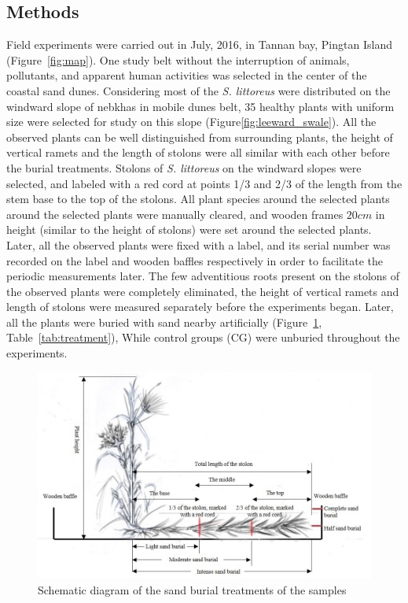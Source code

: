 \documentclass[]{interact}
\theoremstyle{plain}%
\theoremstyle{definition}
\theoremstyle{remark}
\begin{document}
\subsection{Methods}
Field experiments were carried out in July, 2016, in Tannan bay, Pingtan Island (Figure~\ref{fig:map}). One study belt without the interruption of animals, pollutants, and apparent human activities was selected in the center of the coastal sand dunes. 
Considering most of the \textit{S. littoreus} were distributed on the windward slope of nebkhas in mobile dunes belt, 35 healthy plants with uniform size were selected for study on this slope (Figure\ref{fig:leeward_swale}). All the observed plants can be well distinguished from surrounding plants, the height of vertical ramets and the length of stolons were all similar with each other before the burial treatments. Stolons of \textit{S. littoreus} on the windward slopes were selected, and labeled with a red cord at points 1/3 and 2/3 of the length from the stem base to the top of the stolons. All plant species around the selected plants around the selected plants were manually cleared, and wooden frames $20 cm$ in height (similar to the height of stolons) were set around the selected plants. Later, all the observed plants were fixed with a label, and its serial number was recorded on the label and wooden baffles respectively in order to facilitate the periodic measurements later. The few adventitious roots present on the stolons of the observed plants were completely eliminated, the height of vertical ramets and length of stolons were measured separately before the experiments began. Later, all the plants were buried with sand nearby artificially (Figure~\ref{fig:diagram}, Table~\ref{tab:treatment}), While control groups (CG) were unburied throughout the experiments. 


\begin{figure}
  \centering
  \includegraphics[scale=0.5]{../figs/diagram.jpg}
  \caption{Schematic diagram of the sand burial treatments of the samples} 
  \label{fig:diagram}
\end{figure}
\end{document}
